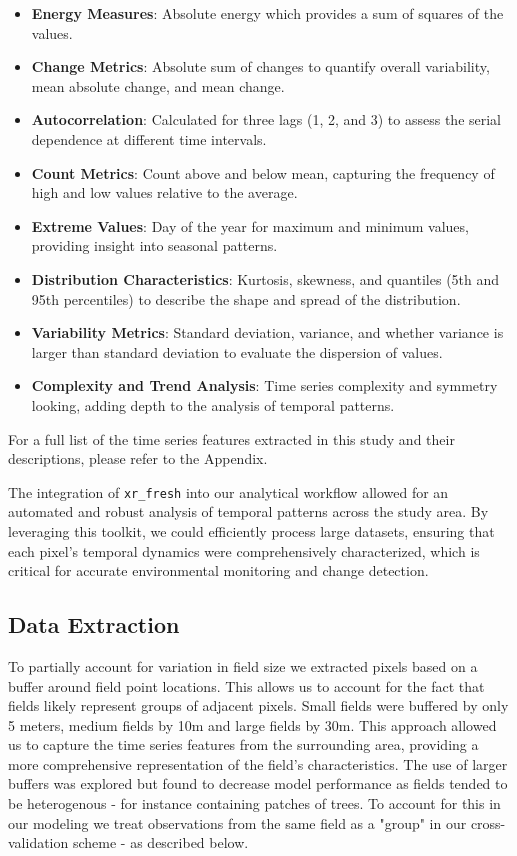 \documentclass[journal]{IEEEtran}
\begin{document}
\begin{itemize}
\item
  \textbf{Energy Measures}: Absolute energy which provides a sum of squares of the values.
\item
  \textbf{Change Metrics}: Absolute sum of changes to quantify overall variability, mean absolute change, and mean change.
\item
  \textbf{Autocorrelation}: Calculated for three lags (1, 2, and 3) to assess the serial dependence at different time intervals.
\item
  \textbf{Count Metrics}: Count above and below mean, capturing the frequency of high and low values relative to the average.
\item
  \textbf{Extreme Values}: Day of the year for maximum and minimum values, providing insight into seasonal patterns.
\item
  \textbf{Distribution Characteristics}: Kurtosis, skewness, and quantiles (5th and 95th percentiles) to describe the shape and spread of the distribution.
\item
  \textbf{Variability Metrics}: Standard deviation, variance, and whether variance is larger than standard deviation to evaluate the dispersion of values.
\item
  \textbf{Complexity and Trend Analysis}: Time series complexity and symmetry looking, adding depth to the analysis of temporal patterns.
\end{itemize}

For a full list of the time series features extracted in this study and their descriptions, please refer to the Appendix.

The integration of \texttt{xr\_fresh} into our analytical workflow allowed for an automated and robust analysis of temporal patterns across the study area. By leveraging this toolkit, we could efficiently process large datasets, ensuring that each pixel's temporal dynamics were comprehensively characterized, which is critical for accurate environmental monitoring and change detection.


\subsection{Data Extraction}

To partially account for variation in field size we extracted pixels based on a buffer around field point locations. This allows us to account for the fact that fields likely represent groups of adjacent pixels. Small fields were buffered by only 5 meters, medium fields by 10m and large fields by 30m. This approach allowed us to capture the time series features from the surrounding area, providing a more comprehensive representation of the field's characteristics. The use of larger buffers was explored but found to decrease model performance as fields tended to be heterogenous - for instance containing patches of trees. To account for this in our modeling we treat observations from the same field as a "group" in our cross-validation scheme - as described below.
\end{document}

